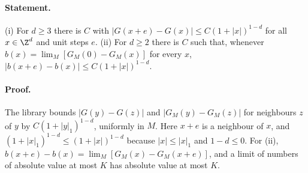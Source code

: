 \paragraph{Statement.} (i) For $d\geq3$ there is $C$ with $|G(x+e)-G(x)|\leq C(1+|x|)^{1-d}$ for all
$x\in\Z^d$ and unit steps $e$. (ii) For $d\geq2$ there is $C$ such that, whenever $b(x)=\lim_M[G_M(0)-G_M(x)]$
for every $x$, $|b(x+e)-b(x)|\leq C(1+|x|)^{1-d}$.
\paragraph{Proof.} The library bounds $|G(y)-G(z)|$ and $|G_M(y)-G_M(z)|$ for neighbours $z$ of $y$ by
$C(1+|y|_1)^{1-d}$, uniformly in $M$. Here $x+e$ is a neighbour of $x$, and $(1+|x|_1)^{1-d}\leq(1+|x|)^{1-d}$
because $|x|\leq|x|_1$ and $1-d\leq0$. For (ii),
$b(x+e)-b(x)=\lim_M[G_M(x)-G_M(x+e)]$, and a limit of numbers of absolute value at most $K$ has absolute
value at most $K$.
